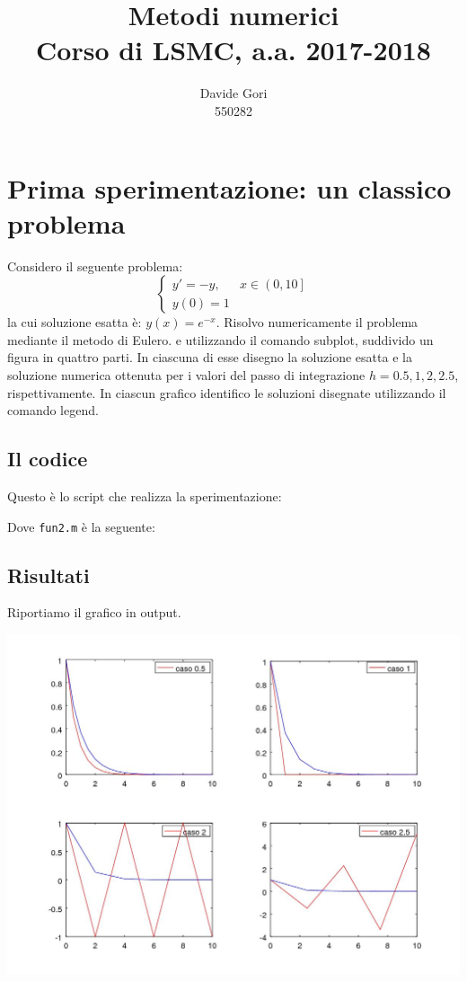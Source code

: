 \documentclass{article}
\title{Metodi numerici\\
	Corso di LSMC, a.a. 2017-2018}
\author{Davide Gori\\
	550282}
\begin{document}
	\maketitle
	\section{Prima sperimentazione: un classico problema}
	Considero il seguente problema:
	\begin{equation}
	\begin{cases}
	y'=-y, & x \in \left(0, 10\right] \\
	y(0)=1
	\end{cases}
	\end{equation}
	la cui soluzione esatta è: $y(x) = e^{-x}$.
	Risolvo numericamente il problema mediante il metodo di Eulero. e utilizzando il comando subplot, suddivido un figura in quattro parti. In ciascuna di esse disegno la soluzione esatta e la soluzione numerica ottenuta per i valori del passo di integrazione $h = 0.5, 1, 2, 2.5$, rispettivamente. In ciascun grafico identifico le soluzioni disegnate utilizzando il comando legend.
	\subsection{Il codice}
	Questo è lo script che realizza la sperimentazione:
	
	
	
	Dove {\tt fun2.m} è la seguente:
	
	
	\subsection{Risultati}
	
	Riportiamo il grafico in output.
	
	\includegraphics[width=\textwidth]{2_1_confronto_h.jpeg}
	
\end{document}
